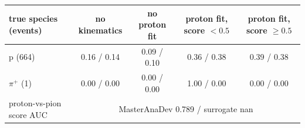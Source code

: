 \begin{tabular}{lcccc}
\toprule
true species (events) & no kinematics & no proton fit & proton fit, score $<0.5$ & proton fit, score $\geq 0.5$ \\
\midrule
p (664) & 0.16 / 0.14 & 0.09 / 0.10 & 0.36 / 0.38 & 0.39 / 0.38 \\
$\pi^+$ (1) & 0.00 / 0.00 & 0.00 / 0.00 & 1.00 / 0.00 & 0.00 / 0.00 \\
\midrule
proton-vs-pion score AUC & \multicolumn{4}{c}{MasterAnaDev 0.789 / surrogate nan} \\
\bottomrule
\end{tabular}
